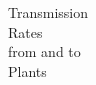 \documentclass[preview]{standalone}
\begin{document}
\begin{center}
Transmission\\Rates\\from and to\\Plants
\end{center}
\end{document}
